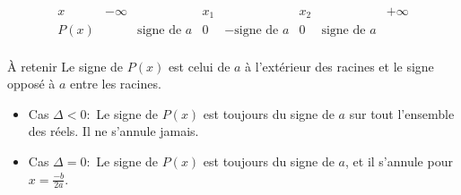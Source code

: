 \documentclass[aspectratio=169,11pt]{beamer}
\begin{document}
	
	\begin{frame}
		\begin{center}
			\renewcommand{\arraystretch}{1.4}
			\[
			\begin{array}{c|ccccccc}
				x & -\infty & & x_1 & & x_2 & &+\infty \\ \hline
				P(x) & & \mbox{signe de }a & 0 & - \mbox{signe de }a& 0 & \mbox{signe de }a&\\
			\end{array}
			\]
		\end{center}
		
		\begin{alertblock}{À retenir}
			Le signe de $P(x)$ est celui de $a$ à l'extérieur des racines
			et le signe opposé à $a$ entre les racines.
		\end{alertblock}
		\begin{itemize}
			\item Cas $\Delta<0: $ Le signe de $P(x)$ est toujours du signe de $a$ sur tout l'ensemble des réels. Il ne s'annule jamais.
			\item  Cas $\Delta=0: $ Le signe de $P(x)$ est toujours du signe de $a$, et il s'annule pour $x=\frac{-b}{2a}$.
		\end{itemize}
	\end{frame}
	
\end{document}
